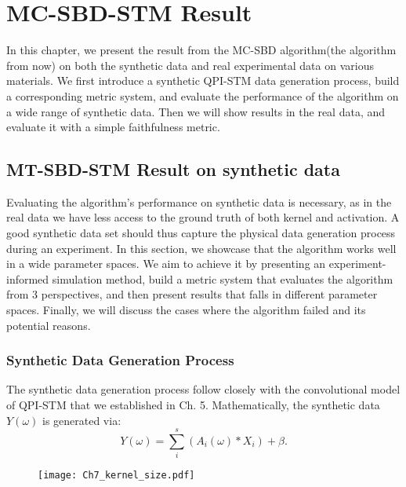 \chapter{MC-SBD-STM Result}

In this chapter, we present the result from the \ac{MC-SBD} algorithm(the algorithm from now) on both the synthetic data and real experimental data on various materials. We first introduce a synthetic QPI-STM data generation process, build a corresponding metric system, and evaluate the performance of the algorithm on a wide range of synthetic data. Then we will show results in the real data, and evaluate it with a simple faithfulness metric. 

\section{MT-SBD-STM Result on synthetic data}
Evaluating the algorithm's performance on synthetic data is necessary, as in the real data we have less access to the ground truth of both kernel and activation. A good synthetic data set should thus capture the physical data generation process during an experiment. In this section, we showcase that the algorithm works well in a wide parameter spaces. We aim to achieve it by presenting an experiment-informed simulation method, build a metric system that evaluates the algorithm from 3 perspectives, and then present results that falls in different parameter spaces. Finally, we will discuss the cases where the algorithm failed and its potential reasons. 

\subsection{Synthetic Data Generation Process}
The synthetic data generation process follow closely with the convolutional model of QPI-STM that we established in Ch. 5. Mathematically, the synthetic data $Y(\omega)$ is generated via:
\begin{equation}
	Y(\omega) = \sum_i^s ( A_i(\omega) * X_i) + \beta. 
\end{equation} 

\begin{figure}
	\texttt{[image: Ch7\_kernel\_size.pdf]} 
	\centering
	\caption{}
	\label{fig:ch7_kernel_size}
\end{figure}

